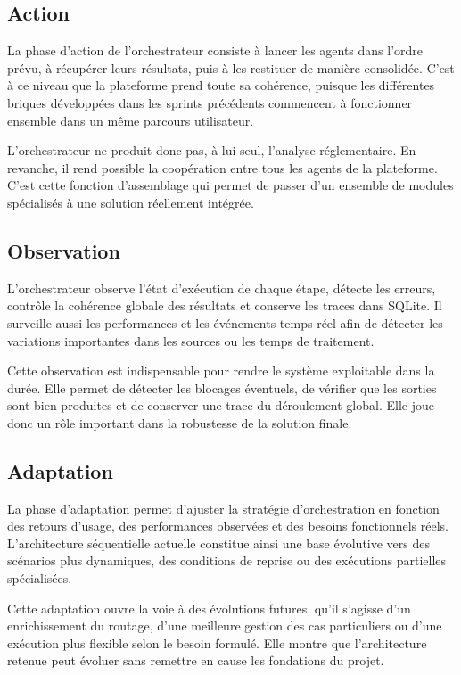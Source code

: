 \documentclass[12pt,a4paper]{report}
\begin{document}
\subsection{Action}

La phase d'action de l'orchestrateur consiste à lancer les agents dans l'ordre prévu, à récupérer leurs résultats, puis à les restituer de manière consolidée. C'est à ce niveau que la plateforme prend toute sa cohérence, puisque les différentes briques développées dans les sprints précédents commencent à fonctionner ensemble dans un même parcours utilisateur.

L'orchestrateur ne produit donc pas, à lui seul, l'analyse réglementaire. En revanche, il rend possible la coopération entre tous les agents de la plateforme. C'est cette fonction d'assemblage qui permet de passer d'un ensemble de modules spécialisés à une solution réellement intégrée.

\subsection{Observation}

L'orchestrateur observe l'état d'exécution de chaque étape, détecte les erreurs, contrôle la cohérence globale des résultats et conserve les traces dans SQLite. Il surveille aussi les performances et les événements temps réel afin de détecter les variations importantes dans les sources ou les temps de traitement.

Cette observation est indispensable pour rendre le système exploitable dans la durée. Elle permet de détecter les blocages éventuels, de vérifier que les sorties sont bien produites et de conserver une trace du déroulement global. Elle joue donc un rôle important dans la robustesse de la solution finale.

\subsection{Adaptation}

La phase d'adaptation permet d'ajuster la stratégie d'orchestration en fonction des retours d'usage, des performances observées et des besoins fonctionnels réels. L'architecture séquentielle actuelle constitue ainsi une base évolutive vers des scénarios plus dynamiques, des conditions de reprise ou des exécutions partielles spécialisées.

Cette adaptation ouvre la voie à des évolutions futures, qu'il s'agisse d'un enrichissement du routage, d'une meilleure gestion des cas particuliers ou d'une exécution plus flexible selon le besoin formulé. Elle montre que l'architecture retenue peut évoluer sans remettre en cause les fondations du projet.
\end{document}
